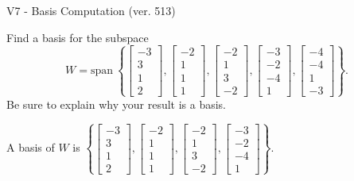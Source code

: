 \begin{exercise}
  \begin{exerciseTitle}V7 - Basis Computation (ver. 513)\end{exerciseTitle}
  \begin{exerciseStatement}
    Find a basis for the subspace 
\[W=\mathrm{span}\ \left\{\left[\begin{array}{r}
-3 \\
3 \\
1 \\
2
\end{array}\right] , \left[\begin{array}{r}
-2 \\
1 \\
1 \\
1
\end{array}\right] , \left[\begin{array}{r}
-2 \\
1 \\
3 \\
-2
\end{array}\right] , \left[\begin{array}{r}
-3 \\
-2 \\
-4 \\
1
\end{array}\right] , \left[\begin{array}{r}
-4 \\
-4 \\
1 \\
-3
\end{array}\right]\right\}.\]
 Be sure to explain why your result is a basis.


  \end{exerciseStatement}
  \begin{exerciseAnswer}
   A basis of \(W\) is  \(\left\{\left[\begin{array}{r}
-3 \\
3 \\
1 \\
2
\end{array}\right] , \left[\begin{array}{r}
-2 \\
1 \\
1 \\
1
\end{array}\right] , \left[\begin{array}{r}
-2 \\
1 \\
3 \\
-2
\end{array}\right] , \left[\begin{array}{r}
-3 \\
-2 \\
-4 \\
1
\end{array}\right]\right\}\).
  


  \end{exerciseAnswer}
\end{exercise}